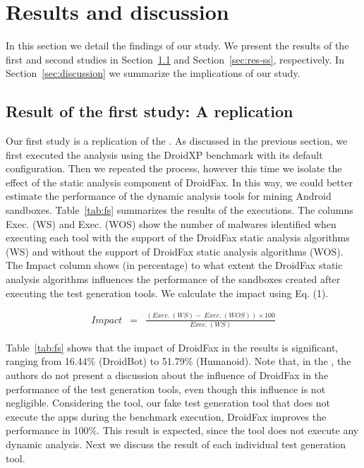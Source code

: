 \section{Results and discussion}

In this section we detail the findings of our study. We present the results of the first and
second studies in Section~\ref{sec:res-fs} and Section~\ref{sec:res-ss}, respectively. In Section~\ref{sec:discussion} we summarize the
implications of our study. 

\subsection{Result of the first study: A \blls replication}\label{sec:res-fs}

Our first study is a replication of the \blls.
As discussed in the previous section, we first executed the analysis using the DroidXP benchmark with its default
configuration. Then we repeated the process, however this time we isolate the effect of the static analysis component of DroidFax. In this way, we could better estimate the performance of the dynamic analysis tools for mining Android sandboxes.
Table~\ref{tab:fs} summarizes the results of the executions. The columns Exec. (WS) and Exec. (WOS) 
show the number of malwares identified when executing each tool with the
support of the DroidFax static analysis algorithms (WS) and without the support
of DroidFax static analysis algorithms (WOS). 
The Impact column shows 
(in percentage) to what extent the DroidFax static analysis algorithms influences
the performance of the sandboxes created after
executing the test generation tools. We calculate the impact
using Eq. (1).

\begin{eqnarray}
Impact & = & \frac{(Exec.\ (WS) - \ Exec.\ (WOS)) \times 100}{Exec.\ (WS)} 
\end{eqnarray}  


Table~\ref{tab:fs} shows that the impact of DroidFax in the results is significant, ranging
from 16.44\% (DroidBot) to 51.79\% (Humanoid). Note that, in the \blls, the authors do not present a
discussion about the influence of DroidFax in the performance of the
test generation tools, even though this influence is not negligible. 
Considering the \joke
tool, our fake test generation tool that does not execute the apps during
the benchmark execution, DroidFax improves the performance in 100\%.
This result is expected, since the \joke tool does not execute any dynamic analysis.
Next we discuss the result of each individual test generation tool. 


